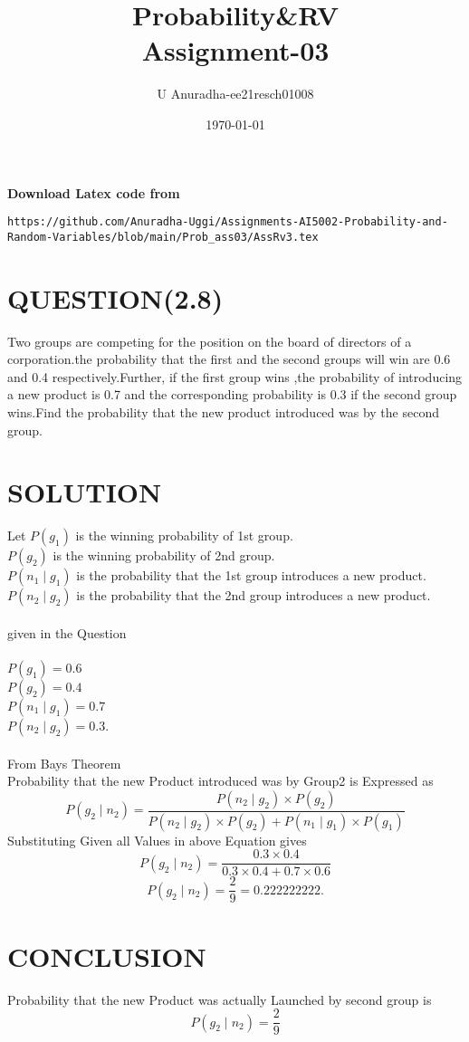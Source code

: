 \documentclass[journal,12pt,twocolumn]{IEEEtran}
\title{Probability\&RV \\ Assignment-03}
\author{U Anuradha-ee21resch01008}
\date{\today}
\begin{document}
\maketitle
\newpage
\bigskip
\renewcommand{\thefigure}{\theenumi}
\renewcommand{\thetable}{\theenumi}
\textbf{Download Latex code from}
\begin{lstlisting}
https://github.com/Anuradha-Uggi/Assignments-AI5002-Probability-and-Random-Variables/blob/main/Prob_ass03/AssRv3.tex
\end{lstlisting}
\section{QUESTION(2.8)}
Two groups are competing for the position on the board of directors of a corporation.the probability that the first and the second groups will win are 0.6 and 0.4 respectively.Further, if the first group wins ,the probability of introducing a new product is 0.7 and the corresponding probability is 0.3 if the second group wins.Find the probability that the new product introduced was by the second group.
\section{SOLUTION}
Let $P(g_1)$ is the winning probability of 1st group.\\
    $P(g_2)$ is the winning probability of 2nd group.\\
    $P(n_1\mid g_1)$ is the probability that the 1st group introduces a new product.\\
    $P(n_2\mid g_2)$ is the probability that the 2nd group introduces a new product.\\
    \\given in the Question\\ \\
    $P(g_1)=0.6$\\
     $P(g_2)=0.4$\\
     $P(n_1\mid g_1)=0.7$\\
     $P(n_2\mid g_2)=0.3$.\\ \\
     From Bays Theorem \\
     Probability that the new Product introduced was by Group2 is Expressed as
\begin{equation*}
   P(g_2\mid n_2)=\frac{P(n_2\mid g_2)\times P(g_2)}{{P(n_2\mid g_2)\times P(g_2)}+{P(n_1\mid g_1)\times P(g_1)}}
\end{equation*}
Substituting Given all Values in above Equation gives
\begin{equation*}
    P(g_2\mid n_2)=\frac{0.3\times 0.4}{{0.3\times 0.4}+{0.7\times 0.6}}
\end{equation*}
\begin{equation*}
    P(g_2\mid n_2)=\frac{2}{9}=0.222222222.
\end{equation*}
\section{CONCLUSION}
Probability that the new Product was actually Launched by second group is 
\begin{equation*}
   P(g_2\mid n_2)=\frac{2}{9}
\end{equation*}
\end{document}
